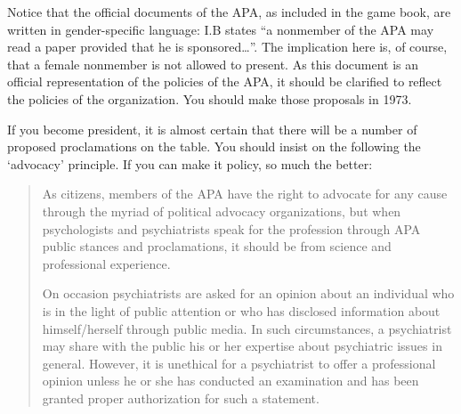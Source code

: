 Notice that the official documents of the APA, as included in the game book, are written in gender-specific language: I.B states ``a nonmember of the APA may read a paper provided that he is sponsored{\ldots}''. The implication here is, of course, that a female nonmember is not allowed to present. As this document is an official representation of the policies of the APA, it should be clarified to reflect the policies of the organization. You should make those proposals in 1973.

If you become president, it is almost certain that there will be a number of proposed proclamations on the table. You should insist on the following the `advocacy' principle. If you can make it policy, so much the better:

\begin{quote}

As citizens, members of the APA have the right to advocate for any cause through the myriad of political advocacy organizations, but when psychologists and psychiatrists speak for the profession through APA public stances and proclamations, it should be from science and professional experience.

On occasion psychiatrists are asked for an opinion about an individual who is in the light of public attention or who has disclosed information about himself\slash herself through public media. In such circumstances, a psychiatrist may share with the public his or her expertise about psychiatric issues in general. However, it is unethical for a psychiatrist to offer a professional opinion unless he or she has conducted an examination and has been granted proper authorization for such a statement.
\end{quote}

